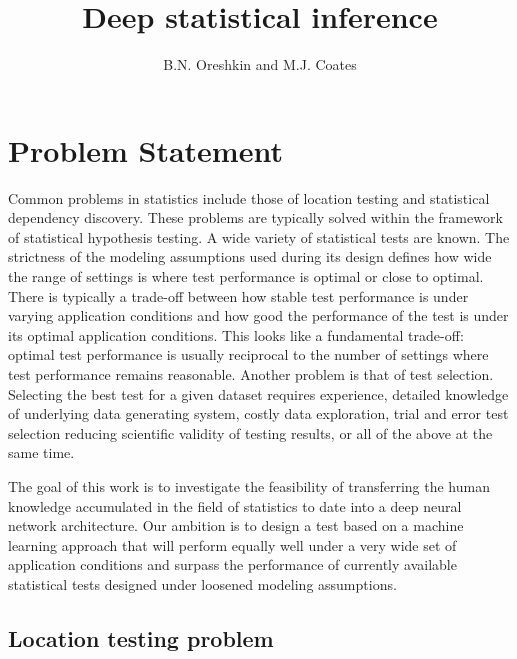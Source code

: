 \documentclass[]{article}
\title{Deep statistical inference}
\author{B.N. Oreshkin and M.J. Coates}
\begin{document}
\maketitle

\begin{abstract}

\end{abstract}

\section{Problem Statement}

Common problems in statistics include those of location testing and statistical dependency discovery. These problems are typically solved within the framework of statistical hypothesis testing. A wide variety of statistical tests are known. The strictness of the modeling assumptions used during its design defines how wide the range of settings is where test performance is optimal or close to optimal. There is typically a trade-off between how stable test performance is under varying application conditions and how good the performance of the test is under its optimal application conditions. This looks like a fundamental trade-off: optimal test performance is usually reciprocal to the number of settings where test performance remains reasonable. Another problem is that of test selection. Selecting the best test for a given dataset requires experience, detailed knowledge of underlying data generating system, costly data exploration, trial and error test selection reducing scientific validity of testing results, or all of the above at the same time. 

The goal of this work is to investigate the feasibility of transferring the human knowledge accumulated in the field of statistics to date into a deep neural network architecture. Our ambition is to design a test based on a machine learning approach that will perform equally well under a very wide set of application conditions and surpass the performance of currently available statistical tests designed under loosened modeling assumptions.

\subsection{Location testing problem}
\end{document}
